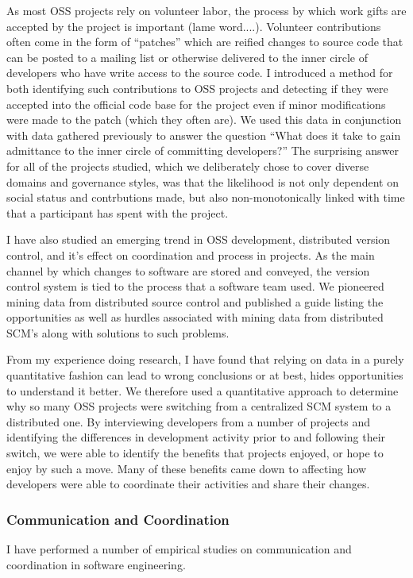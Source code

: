 \documentclass[10pt]{article}
\newcommand\Subsection[1]{\subsubsection*{#1}}
\begin{document}
\begin{small}
As most OSS projects rely on volunteer labor, the process by which work gifts
are accepted by the project is important (lame word....).  Volunteer
contributions often come in the form of ``patches'' which are reified changes
to source code that can be posted to a mailing list or otherwise delivered to
the inner circle of developers who have write access to the source code.  I
introduced a method for both identifying such contributions to OSS projects and
detecting if they were accepted into the official code base for the project
even if minor modifications were made to the patch (which they often are).  We
used this data in conjunction with data gathered previously to answer the
question ``What does it take to gain admittance to the inner circle of
committing developers?'' The surprising answer for all of the projects studied,
which we deliberately chose to cover diverse domains and governance styles, was
that the likelihood is not only dependent on social status and contrbutions
made, but also non-monotonically linked with time that a participant has
spent with the project.

I have also studied an emerging trend in OSS development, distributed version
control, and it's effect on coordination and process in projects.  As the main
channel by which changes to software are stored and conveyed, the version
control system is tied to the process that a software team used.  We pioneered
mining data from distributed source control and published a guide listing the
opportunities as well as hurdles associated with mining data from distributed
SCM's along with solutions to such problems.

From my experience doing research, I have found that relying on data in a
purely quantitative fashion can lead to wrong conclusions or at best, hides
opportunities to understand it better.  We therefore used a quantitative
approach to determine why so many OSS projects were switching from a
centralized SCM system to a distributed one.  By interviewing developers from a
number of projects and identifying the differences in development activity
prior to and following their switch, we were able to identify the benefits that
projects enjoyed, or hope to enjoy by such a move.  Many of these benefits came
down to affecting how developers were able to coordinate their activities
and share their changes.

\Subsection{Communication and Coordination}


I have performed a number of empirical studies on communication and coordination
in software engineering.


\end{small}
\end{document}
